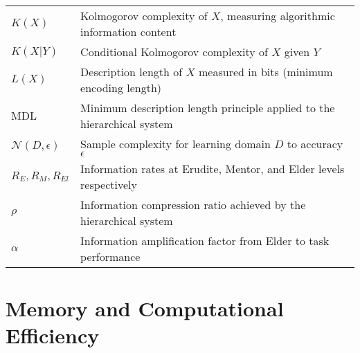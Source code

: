 \begin{tabular}{p{3cm} p{12cm}}
$K(X)$ & Kolmogorov complexity of $X$, measuring algorithmic information content \\
$K(X|Y)$ & Conditional Kolmogorov complexity of $X$ given $Y$ \\
$L(X)$ & Description length of $X$ measured in bits (minimum encoding length) \\
$\text{MDL}$ & Minimum description length principle applied to the hierarchical system \\
$\mathcal{N}(D, \epsilon)$ & Sample complexity for learning domain $D$ to accuracy $\epsilon$ \\
$R_E, R_M, R_{El}$ & Information rates at Erudite, Mentor, and Elder levels respectively \\
$\rho$ & Information compression ratio achieved by the hierarchical system \\
$\alpha$ & Information amplification factor from Elder to task performance \\
\end{tabular}

\newpage
\section*{Memory and Computational Efficiency}

